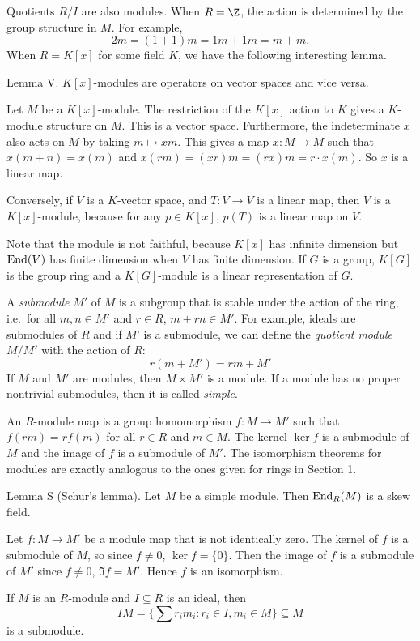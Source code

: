 Quotients $R/I$ are also modules. When $R = \Z$, the action is determined by the group structure in $M$. For example,
$$2m = (1 + 1)m = 1m + 1m = m + m.$$
When $R = K[x]$ for some field $K$, we have the following interesting lemma.

\proclaim Lemma V. $K[x]$-modules are operators on vector spaces and vice versa.

\proof Let $M$ be a $K[x]$-module. The restriction of the $K[x]$ action to $K$ gives a $K$-module structure on $M$. This is a vector space. Furthermore, the indeterminate $x$ also acts on $M$ by taking $m\mapsto xm$. This gives a map $x: M \to M$ such that $x(m + n) = x(m)$ and $x(rm) = (xr)m = (rx)m = r\cdot x(m)$. So $x$ is a linear map.

Conversely, if $V$ is a $K$-vector space, and $T:V\to V$ is a linear map, then $V$ is a $K[x]$-module, because for any $p\in K[x]$, $p(T)$ is a linear map on $V$.\slug

Note that the module is not faithful, because $K[x]$ has infinite dimension but $\mathop {\rm End}(V)$ has finite dimension when $V$ has finite dimension. If $G$ is a group, $K[G]$ is the group ring and a $K[G]$-module is a linear representation of $G$.

A {\it submodule} $M'$ of $M$ is a subgroup that is stable under the action of the ring, i.e.\ for all $m, n\in M'$ and $r\in R$, $m+rn\in M'$. For example, ideals are submodules of $R$ and if $M$' is a submodule, we can define the {\it quotient module} $M/M'$ with the action of $R$:
$$ r(m+M') = rm + M'$$
If $M$ and $M'$ are modules, then $M\times M'$ is a module. If a module has no proper nontrivial submodules, then it is called {\it simple}.

An $R$-module map is a group homomorphism $f:M\to M'$ such that $f(rm) = rf(m)$ for all $r\in R$ and $m\in M$. The kernel $\ker f$ is a submodule of $M$ and the image of $f$ is a submodule of $M'$. The isomorphism theorems for modules are exactly analogous to the ones given for rings in Section 1.

\parenproclaim Lemma S (Schur's lemma). Let $M$ be a simple module. Then $\mathop {\rm End}_R(M)$ is a skew field.

\proof Let $f:M\to M'$ be a module map that is not identically zero. The kernel of $f$ is a submodule of $M$, so since $f\neq 0$, $\ker f = \{0\}$. Then the image of $f$ is a submodule of $M'$ since $f\neq 0$, $\Im f = M'$. Hence $f$ is an isomorphism.\slug

If $M$ is an $R$-module and $I\subseteq R$ is an ideal, then
$$IM = \Big\{\sum r_im_i : r_i\in I, m_i\in M\Big\} \subseteq M$$
is a submodule.

